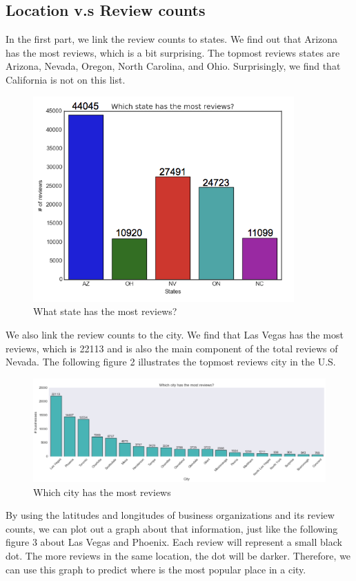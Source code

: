 \documentclass{article}
\begin{document}
\subsection{Location v.s Review counts}
In the first part, we link the review counts to states. We find out that Arizona has the most reviews, which is a bit surprising. The topmost reviews states are Arizona, Nevada, Oregon, North Carolina, and Ohio. Surprisingly, we find that California is not on this list. 
\begin{figure}[!ht]
\centering
\includegraphics[width=10cm]{state.png}
\caption{What state has the most reviews?}
\end{figure}
We also link the review counts to the city. We find that Las Vegas has the most reviews, which is 22113 and is also the main component of the total reviews of Nevada. The following figure 2 illustrates the topmost reviews city in the U.S.
\begin{figure}[!ht]
\includegraphics[width=\textwidth]{City.png}
\caption{Which city has the most reviews}
\end{figure}
By using the latitudes and longitudes of business organizations and its review counts, we can plot out a graph about that information, just like the following figure 3 about Las Vegas and Phoenix. Each review will represent a small black dot. The more reviews in the same location, the dot will be darker. Therefore, we can use this graph to predict where is the most popular place in a city.
\end{document}

